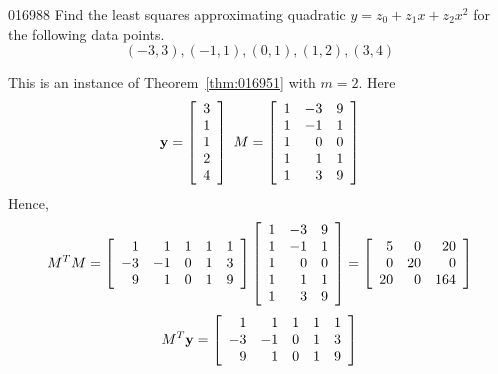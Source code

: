 \begin{example}{}{016988}
Find the least squares approximating quadratic $y = z_{0} + z_{1}x + z_{2}x^{2}$ for the following data points.
\begin{equation*}
(-3, 3), (-1, 1), (0, 1), (1, 2), (3, 4)
\end{equation*}
\begin{solution}
This is an instance of Theorem~\ref{thm:016951} with $m = 2$. Here
\begin{equation*}
\textbf{y} =
\left[ \begin{array}{r}
3\\
1\\
1\\
2\\
4
\end{array} \right]
\ M = 
\left[ \begin{array}{rrr}
1 & -3 &  9 \\
1 & -1 &  1 \\
1 &  0 &  0 \\
1 &  1 &  1 \\
1 &  3 &  9
\end{array} \right]
\end{equation*}
Hence,
\begin{equation*}
M^TM =
\left[ \begin{array}{rrrrr}
 1 &  1 & 1 & 1 & 1 \\
-3 & -1 & 0 & 1 & 3 \\
 9 &  1 & 0 & 1 & 9 
\end{array} \right]
\left[ \begin{array}{rrr}
1 & -3 &  9 \\
1 & -1 &  1 \\
1 &  0 &  0 \\
1 &  1 &  1 \\
1 &  3 &  9
\end{array} \right]
= \left[ \begin{array}{rrr}
 5 &  0 & 20 \\
 0 & 20 &  0 \\
20 &  0 & 164 
\end{array} \right]
\end{equation*}
\begin{equation*}
M^T\vect{y} = 
\leftB \begin{array}{rrrrr}
 1 &  1 & 1 & 1 & 1 \\
-3 & -1 & 0 & 1 & 3 \\
 9 &  1 & 0 & 1 & 9 
\end{array} \rightB

\end{equation*}
\end{solution}
\end{example}
